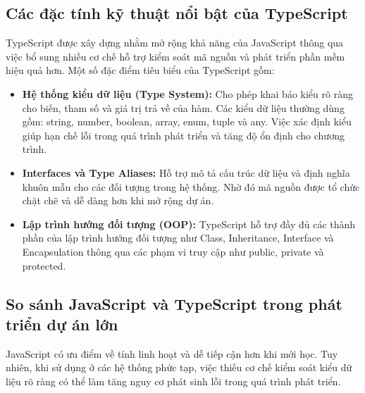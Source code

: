 \documentclass[../main.tex]{subfiles}
\begin{document}
\subsection{Các đặc tính kỹ thuật nổi bật của TypeScript}

TypeScript được xây dựng nhằm mở rộng khả năng của JavaScript thông qua việc bổ sung nhiều cơ chế hỗ trợ kiểm soát mã nguồn và phát triển phần mềm hiệu quả hơn. Một số đặc điểm tiêu biểu của TypeScript gồm:
\begin{itemize}
    \item \textbf{Hệ thống kiểu dữ liệu (Type System):} Cho phép khai báo kiểu rõ ràng cho biến, tham số và giá trị trả về của hàm. Các kiểu dữ liệu thường dùng gồm: string, number, boolean, array, enum, tuple và any. Việc xác định kiểu giúp hạn chế lỗi trong quá trình phát triển và tăng độ ổn định cho chương trình.
    \item \textbf{Interfaces và Type Aliases:} Hỗ trợ mô tả cấu trúc dữ liệu và định nghĩa khuôn mẫu cho các đối tượng trong hệ thống. Nhờ đó mã nguồn được tổ chức chặt chẽ và dễ dàng hơn khi mở rộng dự án.
    \item \textbf{Lập trình hướng đối tượng (OOP):} TypeScript hỗ trợ đầy đủ các thành phần của lập trình hướng đối tượng như Class, Inheritance, Interface và Encapsulation thông qua các phạm vi truy cập như public, private và protected.
\end{itemize}

\subsection{So sánh JavaScript và TypeScript trong phát triển dự án lớn}

JavaScript có ưu điểm về tính linh hoạt và dễ tiếp cận hơn khi mới học. Tuy nhiên, khi sử dụng ở các hệ thống phức tạp, việc thiếu cơ chế kiểm soát kiểu dữ liệu rõ ràng có thể làm tăng nguy cơ phát sinh lỗi trong quá trình phát triển.
\end{document}

